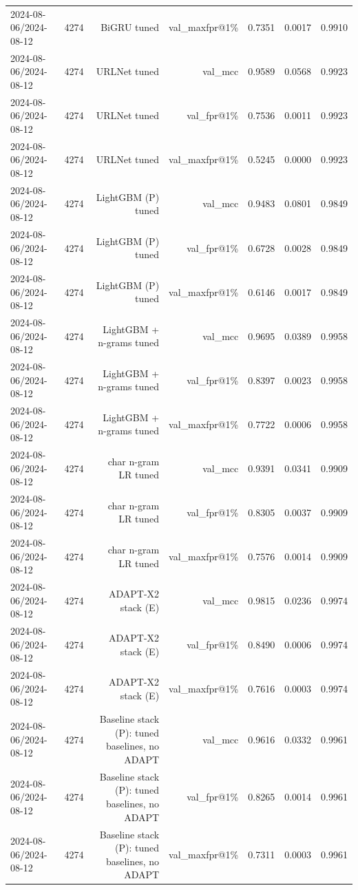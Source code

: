 \begin{table}[t]
\begin{tabular}{llrrrrr}
2024-08-06/2024-08-12 & 4274 & BiGRU tuned & val\_maxfpr@1\% & 0.7351 & 0.0017 & 0.9910 \\
2024-08-06/2024-08-12 & 4274 & URLNet tuned & val\_mcc & 0.9589 & 0.0568 & 0.9923 \\
2024-08-06/2024-08-12 & 4274 & URLNet tuned & val\_fpr@1\% & 0.7536 & 0.0011 & 0.9923 \\
2024-08-06/2024-08-12 & 4274 & URLNet tuned & val\_maxfpr@1\% & 0.5245 & 0.0000 & 0.9923 \\
2024-08-06/2024-08-12 & 4274 & LightGBM (P) tuned & val\_mcc & 0.9483 & 0.0801 & 0.9849 \\
2024-08-06/2024-08-12 & 4274 & LightGBM (P) tuned & val\_fpr@1\% & 0.6728 & 0.0028 & 0.9849 \\
2024-08-06/2024-08-12 & 4274 & LightGBM (P) tuned & val\_maxfpr@1\% & 0.6146 & 0.0017 & 0.9849 \\
2024-08-06/2024-08-12 & 4274 & LightGBM + n-grams tuned & val\_mcc & 0.9695 & 0.0389 & 0.9958 \\
2024-08-06/2024-08-12 & 4274 & LightGBM + n-grams tuned & val\_fpr@1\% & 0.8397 & 0.0023 & 0.9958 \\
2024-08-06/2024-08-12 & 4274 & LightGBM + n-grams tuned & val\_maxfpr@1\% & 0.7722 & 0.0006 & 0.9958 \\
2024-08-06/2024-08-12 & 4274 & char n-gram LR tuned & val\_mcc & 0.9391 & 0.0341 & 0.9909 \\
2024-08-06/2024-08-12 & 4274 & char n-gram LR tuned & val\_fpr@1\% & 0.8305 & 0.0037 & 0.9909 \\
2024-08-06/2024-08-12 & 4274 & char n-gram LR tuned & val\_maxfpr@1\% & 0.7576 & 0.0014 & 0.9909 \\
2024-08-06/2024-08-12 & 4274 & ADAPT-X2 stack (E) & val\_mcc & 0.9815 & 0.0236 & 0.9974 \\
2024-08-06/2024-08-12 & 4274 & ADAPT-X2 stack (E) & val\_fpr@1\% & 0.8490 & 0.0006 & 0.9974 \\
2024-08-06/2024-08-12 & 4274 & ADAPT-X2 stack (E) & val\_maxfpr@1\% & 0.7616 & 0.0003 & 0.9974 \\
2024-08-06/2024-08-12 & 4274 & Baseline stack (P): tuned baselines, no ADAPT & val\_mcc & 0.9616 & 0.0332 & 0.9961 \\
2024-08-06/2024-08-12 & 4274 & Baseline stack (P): tuned baselines, no ADAPT & val\_fpr@1\% & 0.8265 & 0.0014 & 0.9961 \\
2024-08-06/2024-08-12 & 4274 & Baseline stack (P): tuned baselines, no ADAPT & val\_maxfpr@1\% & 0.7311 & 0.0003 & 0.9961 \\

\end{tabular}
\end{table}
